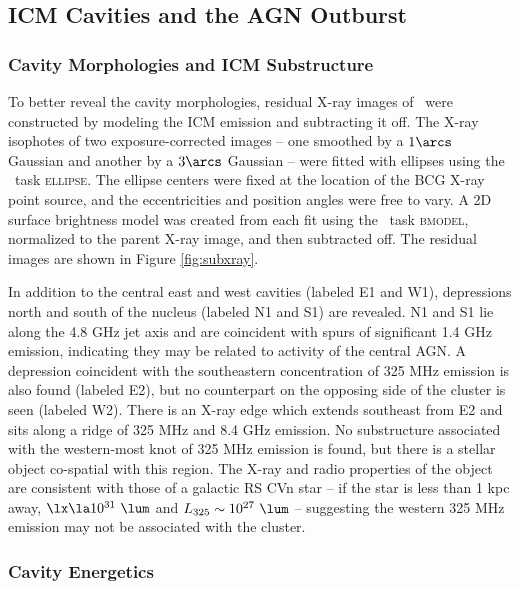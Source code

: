 \documentclass[iop]{emulateapj}
\begin{document}
\subsection{ICM Cavities and the AGN Outburst}
\label{sec:cavities}

\subsubsection{Cavity Morphologies and ICM Substructure}

To better reveal the cavity morphologies, residual X-ray images of
\rbs\ were constructed by modeling the ICM emission and subtracting it
off. The X-ray isophotes of two exposure-corrected images -- one
smoothed by a $1\arcs$ Gaussian and another by a $3\arcs$ Gaussian --
were fitted with ellipses using the \iraf\ task \textsc{ellipse}. The
ellipse centers were fixed at the location of the BCG X-ray point
source, and the eccentricities and position angles were free to
vary. A 2D surface brightness model was created from each fit using
the \iraf\ task \textsc{bmodel}, normalized to the parent X-ray image,
and then subtracted off. The residual images are shown in Figure
\ref{fig:subxray}.

In addition to the central east and west cavities (labeled E1 and W1),
depressions north and south of the nucleus (labeled N1 and S1) are
revealed. N1 and S1 lie along the 4.8 GHz jet axis and are coincident
with spurs of significant 1.4 GHz emission, indicating they may be
related to activity of the central AGN. A depression coincident with
the southeastern concentration of 325 MHz emission is also found
(labeled E2), but no counterpart on the opposing side of the cluster
is seen (labeled W2). There is an X-ray edge which extends southeast
from E2 and sits along a ridge of 325 MHz and 8.4 GHz emission. No
substructure associated with the western-most knot of 325 MHz emission
is found, but there is a stellar object co-spatial with this region.
The X-ray and radio properties of the object are consistent with those
of a galactic RS CVn star \citep{1993RPPh...56.1145S} -- if the star
is less than 1 kpc away, $\lx \la 10^{31} ~\lum$ and $L_{325} \sim
10^{27} ~\lum$ -- suggesting the western 325 MHz emission may not be
associated with the cluster.

\subsubsection{Cavity Energetics}
\label{sec:ecav}
\end{document}
